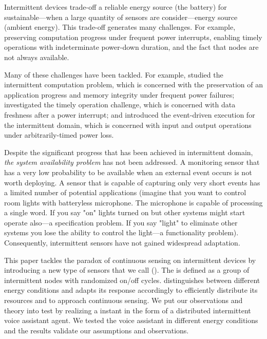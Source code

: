 Intermittent devices trade-off a reliable energy source (the battery) for sustainable---when a large quantity of sensors are consider---energy source (ambient energy). This trade-off generates many challenges. For example, preserving computation progress under frequent power interrupts, enabling timely operations with indeterminate power-down duration, and the fact that nodes are not always available. 
%

Many of these challenges have been tackled. For example, \cite{mementos,dino,colin2016chain} studied the intermittent computation problem, which is concerned with the preservation of an application progress and memory integrity under frequent power failures; \cite{hester2017timely} investigated the timely operation challenge, which is concerned with data freshness after a power interrupt; and \cite{yildirm2018ink} introduced the event-driven execution for the intermittent domain, which is concerned with input and output operations under arbitrarily-timed power loss.%

Despite the significant progress that has been achieved in intermittent domain, \textit{the system availability problem} has not been addressed. A monitoring sensor that has a very low probability to be available when an external event occurs is not worth deploying. A sensor that is capable of capturing only very short events has a limited number of potential applications (imagine that you want to control room lights with batteryless microphone. The microphone is capable of processing a single word. If you say "on" lights turned on but other systems might start operate also---a specification problem. If you say "light" to eliminate other systems you lose the ability to control the light---a functionality problem). Consequently, intermittent sensors have not gained widespread adaptation. 

This paper tackles the paradox of continuous sensing on intermittent devices by introducing a new type of sensors that we call \textit{\fullsys} (\sys). The \sys is defined as a group of intermittent nodes with randomized on/off cycles. \sys distinguishes between different energy conditions and adapts its response accordingly to efficiently distribute its resources and to approach continuous sensing. We put our observations and theory into test by realizing a \sys instant in the form of a distributed intermittent voice assistant agent. We tested the voice assistant in different energy conditions and the results validate our assumptions and observations. 

